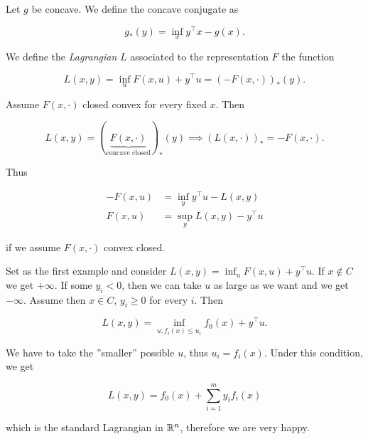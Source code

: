 \begin{definition}
    
    Let $g$ be concave. We define the concave conjugate as 

    \[ g_*(y) = \inf_x y^\top x - g(x). \]

\end{definition}

We define the \emph{Lagrangian} $L$ associated to the representation $F$ the function 

\[ L(x,y) = \inf_u F(x,u) + y^\top u = \left( - F(x,\cdot)\right)_* (y). \]

Assume $F(x,\cdot)$ closed convex for every fixed $x$. Then 

\[ L(x,y) = \left(\underbrace{F(x,\cdot)}_{\text{concave closed}}\right)_*(y) \implies \left(L(x,\cdot)\right)_* = -F(x,\cdot). \]

Thus

\begin{align*}
    -F(x,u) &= \inf_y y^\top u - L(x,y) \\
    F(x,u) &= \sup_y L(x,y) - y^\top u
\end{align*}

if we assume $F(x,\cdot)$ convex closed.

\begin{example}
    
    Set as the first example and consider $L(x,y) = \inf_u F(x,u) + y^\top u$. If $x \notin C$ we get $+\infty$. If some $y_i < 0$, then we can take $u$ as large as we want and we get $-\infty$. Assume then $x \in C$, $y_i \ge 0$ for every $i$. Then 

    \[ L(x,y) = \inf_{u : f_i(x) \le u_i} f_0(x) + y^\top u. \]

    We have to take the ''smaller'' possible $u$, thus $u_i = f_i(x)$. Under this condition, we get 

    \[ L(x,y) = f_0(x) + \sum_{i=1}^m y_i f_i(x)\]

    which is the standard Lagrangian in ${\mathbb{R}^n}$, therefore we are very happy.

\end{example}






